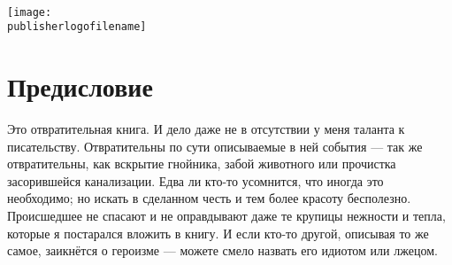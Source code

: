 % 


\begin{titlepage}
{
\centering
{~\par}
\vspace{0.25\textheight}
{\LARGE\bookauthor\par}
\vspace{1.3cm}
{\Huge\textbf{\booktitle}\par}
\vfill
{\texttt{[image: \\publisherlogofilename]}\par}
}
\end{titlepage}


\tableofcontents

\pagestyle{fancy}


\chapter*{Предисловие}

Это отвратительная книга.
И дело даже не в отсутствии у меня таланта к писательству.
Отвратительны по сути описываемые в ней события --- так же отвратительны, как вскрытие гнойника, забой животного или прочистка засорившейся канализации.
Едва ли кто-то усомнится, что иногда это необходимо;
но искать в сделанном честь и тем более красоту бесполезно.
Происшедшее не спасают и не оправдывают даже те крупицы нежности и тепла, которые я постарался вложить в книгу.
И если кто-то другой, описывая то же самое, заикнётся о героизме --- можете смело назвать его идиотом или лжецом.

